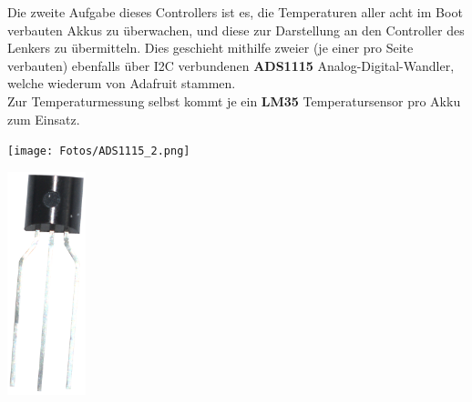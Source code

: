 \newpage
Die zweite Aufgabe dieses Controllers ist es, die Temperaturen aller acht im Boot verbauten Akkus zu überwachen, und diese zur Darstellung an den Controller des Lenkers zu übermitteln.
Dies geschieht mithilfe zweier (je einer pro Seite verbauten) ebenfalls über I2C verbundenen \textbf{ADS1115} Analog-Digital-Wandler, welche wiederum von Adafruit stammen.\\
Zur Temperaturmessung selbst kommt je ein \textbf{LM35} Temperatursensor pro Akku zum Einsatz.\\

\begin{minipage}{8cm}
    \centering
    \texttt{[image: Fotos/ADS1115\_2.png]}
\end{minipage}
\begin{minipage}{8cm}
    \centering
    \includegraphics[width=0.17\textwidth]{Fotos/LM35.png}
\end{minipage}\\
\vspace{0.5cm}

